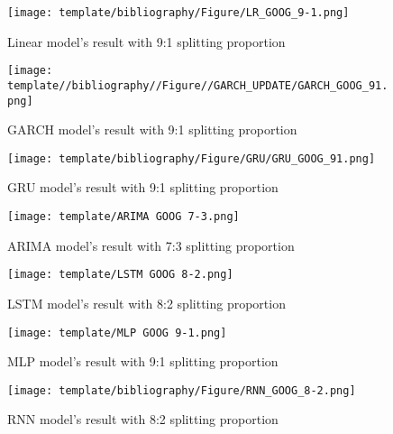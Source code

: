 \documentclass{ieeeojies}
\begin{document}
\begin{figure}[H]
  \centering
  \begin{minipage}{0.8\linewidth}
    \centering
    \texttt{[image: template/bibliography/Figure/LR\_GOOG\_9-1.png]}
    \caption{Linear model's result with 9:1 splitting proportion}
    \label{fig22}
  \end{minipage}
\end{figure}
\begin{figure}[H]
  \centering
  \begin{minipage}{0.8\linewidth}
    \centering
    \texttt{[image: template//bibliography//Figure//GARCH\_UPDATE/GARCH\_GOOG\_91.png]}
    \caption{GARCH model's result with 9:1 splitting proportion}
    \label{fig23}
  \end{minipage}
\end{figure}
\begin{figure}[H]
  \centering
  \begin{minipage}{0.8\linewidth}
    \centering
    \texttt{[image: template/bibliography/Figure/GRU/GRU\_GOOG\_91.png]}
    \caption{GRU model's result with 9:1 splitting proportion}
    \label{fig24}
  \end{minipage}
\end{figure}
\begin{figure}[H]
  \centering
  \begin{minipage}{0.8\linewidth}
    \centering
    \texttt{[image: template/ARIMA GOOG 7-3.png]}
    \caption{ARIMA model's result with 7:3 splitting proportion}
    \label{fig25}
  \end{minipage}
\end{figure}
\begin{figure}[H]
  \centering
  \begin{minipage}{0.8\linewidth}
    \centering
    \texttt{[image: template/LSTM GOOG 8-2.png]}
    \caption{LSTM model's result with 8:2 splitting proportion}
    \label{fig26}
  \end{minipage}
\end{figure}
\begin{figure}[H]
  \centering
  \begin{minipage}{0.8\linewidth}
    \centering
        \texttt{[image: template/MLP GOOG 9-1.png]}
    \caption{MLP model's result with 9:1 splitting proportion}
    \label{fig27}
  \end{minipage}
\end{figure}
\begin{figure}[H]
  \centering
  \begin{minipage}{0.8\linewidth}
    \centering
        \texttt{[image: template/bibliography/Figure/RNN\_GOOG\_8-2.png]}
    \caption{RNN model's result with 8:2 splitting proportion}
    \label{fig28}
  \end{minipage}
\end{figure}
\end{document}
